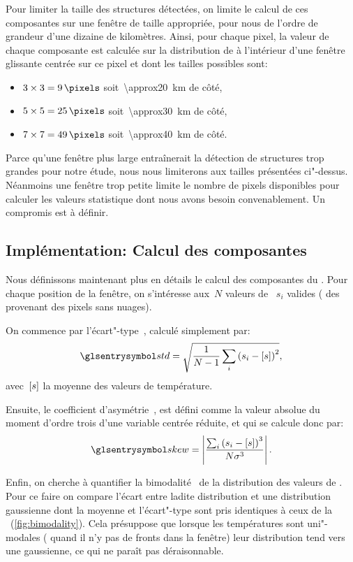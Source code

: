 Pour limiter la taille des structures détectées, on limite le calcul de ces composantes sur une fenêtre de taille appropriée,  pour nous de l'ordre de grandeur d'une dizaine de kilomètres.
Ainsi, pour chaque pixel, la valeur de chaque composante est calculée sur la distribution de  à l'intérieur d'une fenêtre glissante centrée sur ce pixel et dont les tailles possibles sont:
\begin{itemize}
        \item \(3 \times 3 =\qty{9}{\pixels}\) soit~\qty{\approx20}{\km} de côté,
        \item \(5 \times 5 =\qty{25}{\pixels}\) soit~\qty{\approx30}{\km} de côté,
        \item \(7 \times 7 =\qty{49}{\pixels}\) soit~\qty{\approx40}{\km} de côté.
\end{itemize}
Parce qu'une fenêtre plus large entraînerait la détection de structures trop grandes pour notre étude, nous nous limiterons aux tailles présentées ci"-dessus.
Néanmoins une fenêtre trop petite limite le nombre de pixels disponibles pour calculer les valeurs statistique dont nous avons besoin convenablement.
Un compromis est à définir.

\subsection{Implémentation: Calcul des composantes}
\label{sec:calcul-composantes}

Nous définissons maintenant plus en détails le calcul des composantes du .
Pour chaque position de la fenêtre, on s'intéresse aux~\(N\) valeurs de ~\(s_{i}\) valides ( des provenant des pixels sans nuages).

On commence par l'écart"-type~, calculé simplement par:
\begin{equation}
  \am{std} = \sqrt{\frac{1}{N-1} \sum_i \paren{s_i - \moy{s}}^2},
\end{equation}
avec~\(\left[s\right]\) la moyenne des valeurs de température.

Ensuite, le coefficient d'asymétrie~, est défini comme la valeur absolue du moment d'ordre trois d'une variable centrée réduite, et qui se calcule donc par:
\begin{equation}
  \am{skew} = \abs{\frac{\sum_i \paren{s_i - \moy{s}}^3} {N \sigma^3}}.
\end{equation}

Enfin, on cherche à quantifier la bimodalité~ de la distribution des valeurs de .
Pour ce faire on compare l'écart entre ladite distribution et une distribution gaussienne dont la moyenne et l'écart"-type sont pris identiques à ceux de la ~(\cref{fig:bimodality}).
Cela présuppose que lorsque les températures sont uni"-modales ( quand il n'y pas de fronts dans la fenêtre) leur distribution tend vers une gaussienne, ce qui ne paraît pas déraisonnable.

